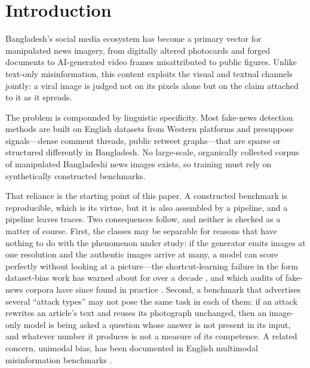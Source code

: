 \documentclass[journal]{IEEEtran}
\begin{document}
%
%

\section{Introduction}

Bangladesh's social media ecosystem has become a primary vector for manipulated
news imagery, from digitally altered photocards and forged documents to
AI-generated video frames misattributed to public figures. Unlike text-only
misinformation, this content exploits the visual and textual channels jointly:
a viral image is judged not on its pixels alone but on the claim attached to it
as it spreads.

The problem is compounded by linguistic specificity. Most fake-news detection
methods are built on English datasets from Western platforms and presuppose
signals---dense comment threads, public retweet graphs---that are sparse or
structured differently in Bangladesh. No large-scale, organically collected
corpus of manipulated Bangladeshi news images exists, so training must rely on
synthetically constructed benchmarks.

That reliance is the starting point of this paper. A constructed benchmark is
reproducible, which is its virtue, but it is also assembled by a pipeline, and
a pipeline leaves traces. Two consequences follow, and neither is checked as a
matter of course. First, the classes may be separable for reasons that have
nothing to do with the phenomenon under study: if the generator emits images at
one resolution and the authentic images arrive at many, a model can score
perfectly without looking at a picture---the shortcut-learning failure
\cite{shortcut} in the form dataset-bias work has warned about for over a
decade \cite{datasetbias}, and which audits of fake-news corpora have since
found in practice \cite{verma}. Second, a benchmark that advertises several
``attack types'' may not pose the same task in each of them: if an attack
rewrites an article's text and reuses its photograph unchanged, then an
image-only model is being asked a question whose answer is not present in its
input, and whatever number it produces is not a measure of its competence. A
related concern, unimodal bias, has been documented in English multimodal
misinformation benchmarks \cite{verite}.
\end{document}

